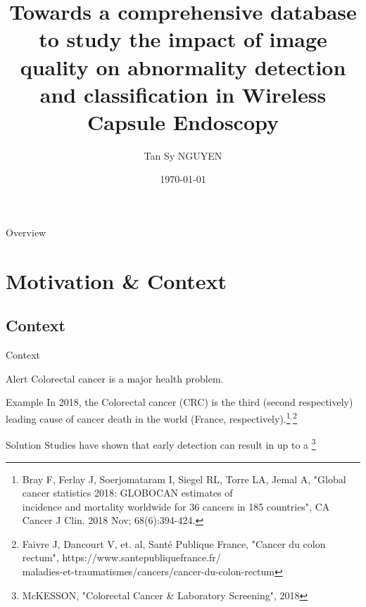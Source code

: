 \documentclass{libs/ufc_format}
\title[Universit\'e Sorbonne Paris Nord]{\textbf{Towards a comprehensive database to study the impact of image quality on abnormality detection and classification in Wireless Capsule Endoscopy}}
\author{Tan Sy NGUYEN}
\institute[]{
    \normalsize{\email{tansy.nguyen@math.univ-paris13.fr}}
    \newline
    \department{LAGA, L2TI}
    \newline
    \uspn
}
\date{\today}
\begin{document}


\begin{frame}{}
    \maketitle
\end{frame}

\begin{frame}{Overview}
    \tableofcontents
\end{frame}

\section{Motivation \& Context}
\subsection{Context}

\begin{frame}{Context}
    \begin{alertblock}{Alert}
        Colorectal cancer is a major health problem.
    \end{alertblock}
    \pause
    \begin{block}{Example}
        In 2018, the Colorectal cancer (CRC) is the third (second respectively) leading cause of cancer death in the world (France, respectively).\footnote[frame]{\tiny Bray F, Ferlay J, Soerjomataram I, Siegel RL, Torre LA, Jemal A, "Global cancer statistics 2018: GLOBOCAN estimates of \\ \hspace{0.3cm}incidence and mortality worldwide for 36 cancers in 185 countries", CA Cancer J Clin. 2018 Nov; 68(6):394-424.}$^{,}$\footnote[frame]{\tiny Faivre J, Dancourt V, et. al, Santé Publique France, "Cancer du colon rectum", https://www.santepubliquefrance.fr/\\maladies-et-traumatismes/cancers/cancer-du-colon-rectum}
    \end{block}
    \pause
    \begin{exampleblock}{Solution}
        Studies have shown that early detection can result in up to a \footnote[frame]{\tiny McKESSON, "Colorectal Cancer \& Laboratory Screening", 2018}
    \end{exampleblock}

\end{frame}
\end{document}
